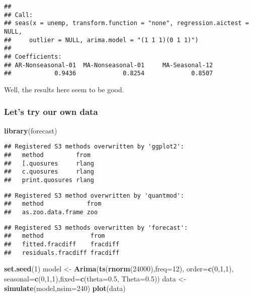 \documentclass[]{article}
\newenvironment{Shaded}{\begin{snugshade}}{\end{snugshade}}
\newcommand{\DataTypeTok}[1]{\textcolor[rgb]{0.13,0.29,0.53}{#1}}
\newcommand{\DecValTok}[1]{\textcolor[rgb]{0.00,0.00,0.81}{#1}}
\newcommand{\FloatTok}[1]{\textcolor[rgb]{0.00,0.00,0.81}{#1}}
\newcommand{\KeywordTok}[1]{\textcolor[rgb]{0.13,0.29,0.53}{\textbf{#1}}}
\newcommand{\NormalTok}[1]{#1}
\newcommand{\StringTok}[1]{\textcolor[rgb]{0.31,0.60,0.02}{#1}}
\begin{document}
\begin{verbatim}
## 
## Call:
## seas(x = unemp, transform.function = "none", regression.aictest = NULL, 
##     outlier = NULL, arima.model = "(1 1 1)(0 1 1)")
## 
## Coefficients:
## AR-Nonseasonal-01  MA-Nonseasonal-01     MA-Seasonal-12  
##            0.9436             0.8254             0.8507
\end{verbatim}

Well, the results here seem to be good.

\hypertarget{lets-try-our-own-data}{%
\subsubsection{Let's try our own data}\label{lets-try-our-own-data}}

\begin{Shaded}
\begin{Highlighting}[]
\KeywordTok{library}\NormalTok{(forecast)}
\end{Highlighting}
\end{Shaded}

\begin{verbatim}
## Registered S3 methods overwritten by 'ggplot2':
##   method         from 
##   [.quosures     rlang
##   c.quosures     rlang
##   print.quosures rlang
\end{verbatim}

\begin{verbatim}
## Registered S3 method overwritten by 'quantmod':
##   method            from
##   as.zoo.data.frame zoo
\end{verbatim}

\begin{verbatim}
## Registered S3 methods overwritten by 'forecast':
##   method             from    
##   fitted.fracdiff    fracdiff
##   residuals.fracdiff fracdiff
\end{verbatim}

\begin{Shaded}
\begin{Highlighting}[]
\KeywordTok{set.seed}\NormalTok{(}\DecValTok{1}\NormalTok{)}
\NormalTok{model <-}\StringTok{ }\KeywordTok{Arima}\NormalTok{(}\KeywordTok{ts}\NormalTok{(}\KeywordTok{rnorm}\NormalTok{(}\DecValTok{24000}\NormalTok{),}\DataTypeTok{freq=}\DecValTok{12}\NormalTok{), }\DataTypeTok{order=}\KeywordTok{c}\NormalTok{(}\DecValTok{0}\NormalTok{,}\DecValTok{1}\NormalTok{,}\DecValTok{1}\NormalTok{), }\DataTypeTok{seasonal=}\KeywordTok{c}\NormalTok{(}\DecValTok{0}\NormalTok{,}\DecValTok{1}\NormalTok{,}\DecValTok{1}\NormalTok{),}\DataTypeTok{fixed=}\KeywordTok{c}\NormalTok{(}\DataTypeTok{theta=}\FloatTok{0.5}\NormalTok{, }\DataTypeTok{Theta=}\FloatTok{0.5}\NormalTok{))}
\NormalTok{data <-}\StringTok{ }\KeywordTok{simulate}\NormalTok{(model,}\DataTypeTok{nsim=}\DecValTok{240}\NormalTok{)}
\KeywordTok{plot}\NormalTok{(data)}
\end{Highlighting}
\end{Shaded}
\end{document}
